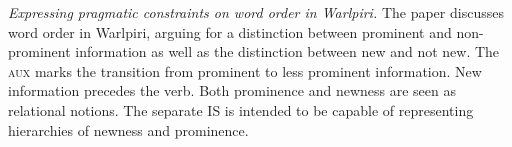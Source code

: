 \documentclass[output=paper,hidelinks]{langscibook}
\begin{document}
 

\vspace{+6pt} 
\citet{Simpson2007} \textit{Expressing pragmatic constraints on word order in Warlpiri. }The paper discusses word order in Warlpiri, arguing for a distinction between prominent and non-prominent information as well as the distinction between new and not new. The \textsc{aux} marks the transition from prominent to less prominent information. New information precedes the verb. Both prominence and newness are seen as relational notions. The separate IS is intended to be capable of representing hierarchies of newness and prominence. 
 
 
\end{document}

